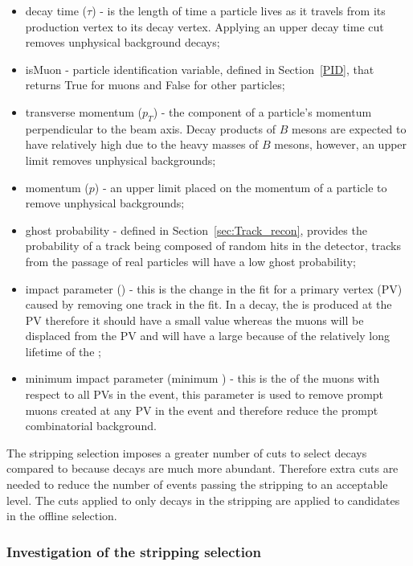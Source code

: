 \begin{itemize}
\item decay time ($\tau$) - is the length of time a particle lives as it travels from its production vertex to its decay vertex. Applying an upper decay time cut removes unphysical background decays;
\item isMuon - particle identification variable, defined in Section~\ref{PID}, that returns True for muons and False for other particles;
\item transverse momentum ($p_{T}$) - the component of a particle's momentum perpendicular to the beam axis. Decay products of $B$ mesons are expected to have relatively high \pt due to the heavy masses of $B$ mesons, however, an upper limit removes unphysical backgrounds;
\item momentum ($p$) - an upper limit placed on the momentum of a particle to remove unphysical backgrounds;
\item ghost probability - defined in Section~\ref{sec:Track_recon}, provides the probability of a track being composed of random hits in the detector, tracks from the passage of real particles will have a low ghost probability; 
\item impact parameter \chisqd (\chiIP) - this is the change in the fit \chisqd for a primary vertex (PV) caused by removing one track in the fit. In a \bmumu decay, the \bsd is produced at the PV therefore it should have a small \chiIP value whereas the muons will be displaced from the PV and will have a large \chiIP because of the relatively long lifetime of the \bsd;
\item minimum impact parameter (minimum \chiIP) - this is the \chiIP  of the muons with respect to all PVs in the event, this parameter is used to remove prompt muons created at any PV in the event and therefore reduce the prompt combinatorial background. 
\end{itemize}

The stripping selection imposes a greater number of cuts to select \bhh decays compared to \bsmumu because \bhh decays are much more abundant. Therefore extra cuts are needed to reduce the number of events passing the stripping to an acceptable level. The cuts applied to only \bhh decays in the stripping are applied to \bmumu candidates in the offline selection. %


\subsubsection{Investigation of the stripping selection}
\label{strippingstudies}

